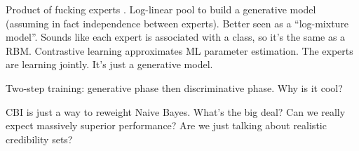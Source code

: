 \documentclass[english]{scrartcl}
\begin{document}





{\color{red}Product of fucking experts \cite{Hinton-02}. Log-linear pool to build a generative model (assuming in fact independence between experts). Better seen as a ``log-mixture model''. Sounds like each expert is associated with a class, so it's the same as a RBM. Contrastive learning approximates ML parameter estimation. The experts are learning jointly. It's just a generative model.}

{\color{red}Two-step training: generative phase then discriminative phase. Why is it cool?}

{\color{red}CBI is just a way to reweight Naive Bayes. What's the big deal? Can we really expect massively superior performance? Are we just talking about realistic credibility sets?}
\end{document}
